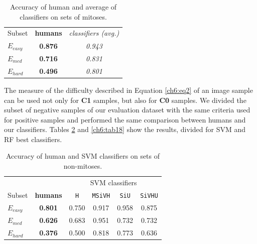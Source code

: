 \begin{table}[!hbt]
 \small
 \centering
 \begin{tabular}{lcc}
    \toprule
    Subset        & \textbf{humans}     & \textit{classifiers (avg.)} \\
    \cmidrule(lr){1-3}
     $E_{easy}$   & \textbf{0.876}      & \textit{0.943}         \\
     $E_{med}$    & \textbf{0.716}      & \textit{0.831}         \\ 
     $E_{hard}$   & \textbf{0.496}      & \textit{0.801}        \\
     \bottomrule
 \end{tabular}
 \caption{Accuracy of human and average of classifiers on sets of mitoses.}
 \label{ch6:tab16}
\end{table}

The measure of the difficulty described in Equation \ref{ch6:eq2} of an image sample can be used not only for \textbf{C1} samples, but also for \textbf{C0} samples.
We divided the subset of negative samples of our evaluation dataset with the same criteria used for positive samples and performed the same comparison between
humans and our classifiers. Tables \ref{ch6:tab17} and \ref{ch6:tab18} show the results, divided for \Gls{SVM} and \Gls{RF} best classifiers.




\begin{table}[!hbt]
\small
 \centering
 \begin{tabular}{lccccc}
  \toprule
                  &            &  \multicolumn{4}{c}{SVM classifiers}    \\
    \cmidrule(lr){3-6}
    Subset        & \textbf{humans}     & \texttt{H} & \texttt{MSiVH} & \texttt{SiU}   & \texttt{SiVHU} \\
    \midrule
     $E_{easy}$   & \textbf{0.801}      & 0.750      & 0.917          & 0.958          & 0.875          \\
     $E_{med}$    & \textbf{0.626}      & 0.683      & 0.951          & 0.732          & 0.732          \\ 
     $E_{hard}$   & \textbf{0.376}      & 0.500      & 0.818          & 0.773          & 0.636          \\
     \bottomrule
 \end{tabular}
 \caption{Accuracy of human and SVM classifiers on sets of non-mitoses.}
 \label{ch6:tab17}
\end{table}



